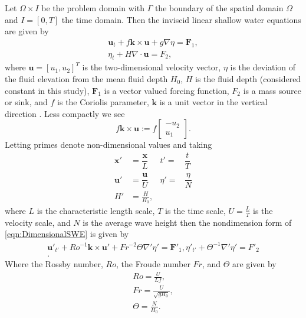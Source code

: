 Let $\Omega \times I$ be the problem domain with $\Gamma$ the boundary of the
spatial domain $\Omega$ and $I = [0, T]$ the time domain.  Then the inviscid
linear shallow water equations are given by
\begin{equation}
  \begin{split}
    \mathbf{u}_t + f\mathbf{k} \times \mathbf{u} + g \nabla \eta = \mathbf{F}_1, \\
    \eta_t + H \nabla\cdot \mathbf{u} = F_2,
  \end{split}
  \label{eqn:DimensionalSWE}
\end{equation}
where $\mathbf{u}=[u_1,u_2]^T$ is the two-dimensional velocity vector, $\eta$ is
the deviation of the fluid elevation from the mean fluid depth $H_0$, $H$ is the
fluid depth (considered constant in this study), $\mathbf{F}_1$ is a vector
valued forcing function, $F_2$ is a mass source or sink, and $f$ is the Coriolis
parameter, $\mathbf{k}$ is a unit vector in the vertical direction
\cite{Hanert2004, LeBlond1981, Le-Roux1998}.  Less compactly we see
\begin{equation}
  f\mathbf{k} \times \mathbf{u} := f\begin{bmatrix}
    -u_2 \\
    u_1
  \end{bmatrix}.
  \label{eqn:Coriolis}
\end{equation}
Letting primes denote non-dimensional values and taking
\begin{align*}
    \mathbf{x}' &= \dfrac{\mathbf{x}}{L} &t' =& \dfrac{t}{T} \\[1em]
    \mathbf{u}' &= \dfrac{\mathbf{u}}{U} &\eta' =& \dfrac{\eta}{N} \\[1em]
    H' &= \frac{H}{H_0},
\end{align*}
where $L$ is the characteristic length scale, $T$ is the time scale,
$U=\frac{L}{T}$ is the velocity scale, and $N$ is the average wave height then
the nondimension form of \eqref{eqn:DimensionalSWE} is given by
\begin{equation}
  \begin{split}
    \mathbf{u}'_{t'} + Ro^{-1} \mathbf{k}\times\mathbf{u}' 
        + Fr^{-2} \Theta \nabla' \eta' = \mathbf{F}'_1, 
      \eta'_{t'} + \Theta^{-1} \nabla' \eta' = F'_2 \\.
  \end{split}
  \label{eqn:NondimensionalSWE}
\end{equation}
Where the Rossby number, $Ro$, the Froude number $Fr$, and $\Theta$ are given by
\begin{align}
  Ro = \frac{U}{Lf}, \label{eqn:Rossby} \\
  Fr = \frac{U}{\sqrt{gH_0}}, \label{eqn:Froude} \\
  \Theta = \frac{N}{H_0}. \label{eqn:Theta}
\end{align}
